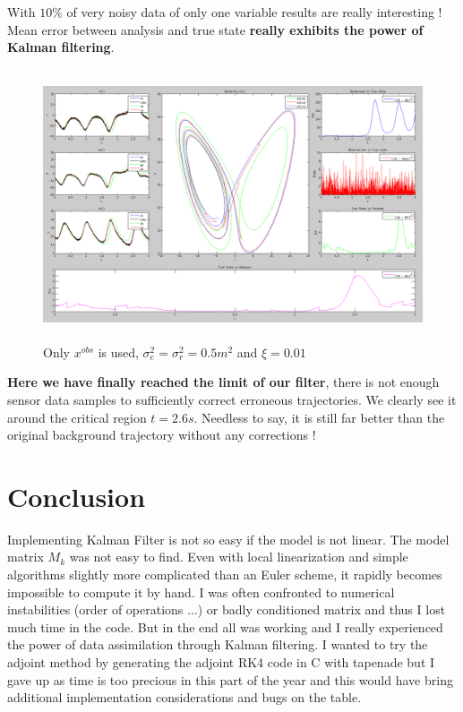 \documentclass[11pt,a4paper]{article}
\begin{document}
With $10\%$ of very noisy data of only one variable results are really interesting ! Mean error between analysis and true state \textbf{really exhibits the power of Kalman filtering}.

\begin{figure}[H]
    \centering
   \includegraphics[height=8cm]{Q13b.png}
   \caption{Only $x^{obs}$ is used, $\sigma_e^2 = \sigma_r^2 = 0.5m^2$ and $\xi = 0.01$}
\end{figure}

\textbf{Here we have finally reached the limit of our filter}, there is not enough sensor data samples to sufficiently correct erroneous trajectories. We clearly see it around the critical region $t = 2.6s$. Needless to say, it is still far better than the original background trajectory without any corrections !

\clearpage
\section {Conclusion}

Implementing Kalman Filter is not so easy if the model is not linear. The model matrix $M_k$ was not easy to find. Even with local linearization and simple algorithms slightly more complicated than an Euler scheme, it rapidly becomes impossible to compute it by hand. I was often confronted to numerical instabilities (order of operations ...) or badly conditioned matrix and thus I lost much time in the code. But in the end all was working and I really experienced the power of data assimilation through Kalman filtering. I wanted to try the adjoint method by generating the adjoint RK4 code in C with tapenade but I gave up as time is too precious in this part of the year and this would have bring additional implementation considerations and bugs on the table.
\end{document}
